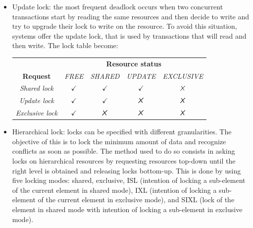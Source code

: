 \begin{itemize}
    \item Update lock: the most frequent deadlock occurs when two concurrent transactions start by reading the same resources and then decide to write and try to upgrade their 
    lock to write on the resource. To avoid this situation, systems offer the update lock, that is used by transactions that will read and then write. The lock table become: 
    \begin{table}[H]
        \centering
        \begin{tabular}{ccccc}
        \textbf{}                                     & \multicolumn{4}{c}{\textbf{Resource status}}                                                                                                        \\ \cline{2-5} 
        \multicolumn{1}{c|}{\textbf{Request}}         & \textit{FREE}                     & \textit{SHARED}                   & \textit{UPDATE}                   & \multicolumn{1}{c|}{\textit{EXCLUSIVE}} \\ \hline
        \multicolumn{1}{|c|}{\textit{Shared lock}}    & \multicolumn{1}{c|}{$\checkmark$} & \multicolumn{1}{c|}{$\checkmark$} & \multicolumn{1}{c|}{$\checkmark$} & \multicolumn{1}{c|}{$\tikzxmark$}       \\ \hline
        \multicolumn{1}{|c|}{\textit{Update lock}}    & \multicolumn{1}{c|}{$\checkmark$} & \multicolumn{1}{c|}{$\checkmark$} & \multicolumn{1}{c|}{$\tikzxmark$} & \multicolumn{1}{c|}{$\tikzxmark$}       \\ \hline
        \multicolumn{1}{|c|}{\textit{Exclusive lock}} & \multicolumn{1}{c|}{$\checkmark$} & \multicolumn{1}{c|}{$\tikzxmark$} & \multicolumn{1}{c|}{$\tikzxmark$} & \multicolumn{1}{c|}{$\tikzxmark$}       \\ \hline
        \end{tabular}
    \end{table}
    \item Hierarchical lock: locks can be specified with different granularities. The objective of this is to lock the minimum amount of data and recognize conflicts as soon as
    possible. The method used to do so consists in asking locks on hierarchical resources by requesting resources top-down until the right level is obtained and releasing 
    locks bottom-up. This is done by using five locking modes: shared, exclusive, ISL (intention of locking a sub-element of the current element in shared mode), IXL (intention 
    of locking a sub-element of the current element in exclusive mode), and SIXL (lock of the element in shared mode with intention of locking a sub-element in exclusive mode). 

\end{itemize}
